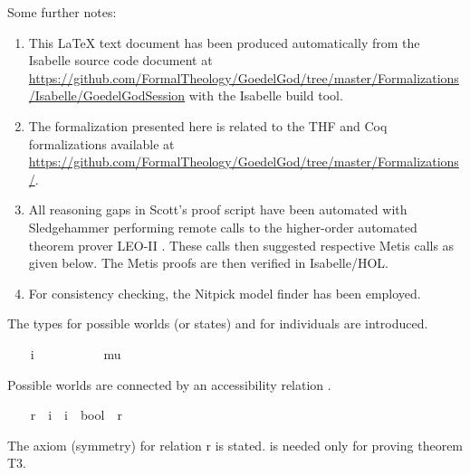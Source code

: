 \begin{isabellebody}
\begin{isamarkuptext}
 Some further notes: \sloppy
 \begin{enumerate}
 \item This LaTeX text document has been produced automatically from the Isabelle source
 code document at 
 \url{https://github.com/FormalTheology/GoedelGod/tree/master/Formalizations/Isabelle/GoedelGodSession} 
 with the Isabelle build tool.
 \item The formalization presented here is related to the THF \cite{J22} and 
    Coq \cite{Coq} formalizations available at
    \url{https://github.com/FormalTheology/GoedelGod/tree/master/Formalizations/}.
 \item All reasoning gaps in Scott's proof script have been automated 
    with Sledgehammer \cite{Sledgehammer} performing remote calls to the higher-order automated
    theorem prover LEO-II \cite{LEO-II}. These calls then suggested respective 
    Metis \cite{Metis} calls as given below. The Metis proofs are then verified in Isabelle/HOL.
 \item For consistency checking, the Nitpick model finder \cite{Nitpick} has been employed.
 \end{enumerate}%
\end{isamarkuptext}%
\isamarkuptrue%
%
\isamarkuptrue%
%
\begin{isamarkuptext}%
The types  for possible worlds (or states) and  for individuals 
are introduced.%
\end{isamarkuptext}%
\isamarkuptrue%
\ \ \isamarkupfalse%
\ i\ \ \ \ \ %
\ \isanewline
\ \ \isamarkupfalse%
\ mu\ \ \ \ %
%
\begin{isamarkuptext}%
Possible worlds are connected by an accessibility relation .%
\end{isamarkuptext}%
\isamarkuptrue%
\ \ \isamarkupfalse%
\ r\ {\isacharcolon}{\isacharcolon}\ {\isachardoublequoteopen}i\ {\isasymRightarrow}\ i\ {\isasymRightarrow}\ bool{\isachardoublequoteclose}\ {\isacharparenleft}\ {\isachardoublequoteopen}r{\isachardoublequoteclose}\ {}{}{\isacharparenright}\ \ \ \ %
%
\begin{isamarkuptext}%
The  axiom (symmetry) for relation r is stated.  is needed only 
for proving theorem T3.%
\end{isamarkuptext}%

\end{isabellebody}
